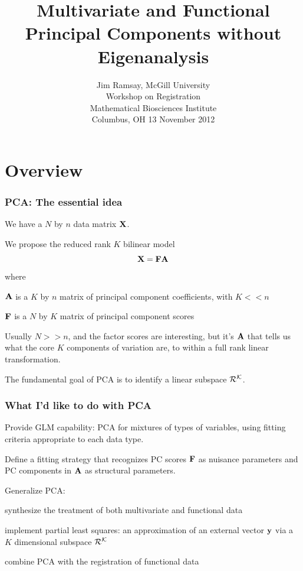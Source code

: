 \documentclass[11pt]{beamer}
\title{Multivariate and Functional Principal Components without Eigenanalysis}
\author{Jim Ramsay, McGill University \\
      Workshop on Registration \\
      Mathematical Biosciences Institute \\
      Columbus, OH
      13 November 2012}
\date{}
\begin{document}
\begin{frame}

\maketitle

\end{frame}


\section{Overview}


\begin{frame}

\frametitle{PCA: The essential idea}

\bi
  \item We have a $N$ by $n$ data matrix $\mbox{\bf X}$.
  \item We propose the reduced rank $K$ bilinear model
  \[
    \mbox{\bf X} = \mbox{\bf F} \mbox{\bf A}
  \]
  where
    \bi
      \item $\mbox{\bf A}$ is a $K$ by $n$ matrix of principal component coefficients, with $K << n$
      \item $\mbox{\bf F}$ is a $N$ by $K$ matrix of principal component scores
    \ei
  \item Usually $N >> n$, and the factor scores are interesting, but it's $\mbox{\bf A}$ that tells
  us what the core $K$ components of variation are, to within a full rank linear transformation.
  \item The fundamental goal of PCA is to identify a linear subspace $\cal{R}^K$.
\ei

\end{frame}


\begin{frame}

\frametitle{What I'd like to do with PCA}

\bi
  \item Provide GLM capability: PCA for mixtures of types of variables, using fitting criteria
  appropriate to each data type.
  \item Define a fitting strategy that recognizes PC scores $\mbox{\bf F}$ as nuisance parameters
  and PC components in $\mbox{\bf A}$ as structural parameters.
  \item Generalize PCA:
    \bi
      \item synthesize the treatment of both multivariate and functional data
      \item implement partial least squares: an approximation of an external vector $\mbox{\bf y}$ via a $K$ dimensional subspace $\cal{R}^K$
      \item combine PCA with the registration of functional data
    \ei
\ei

\end{frame}
\end{document}
